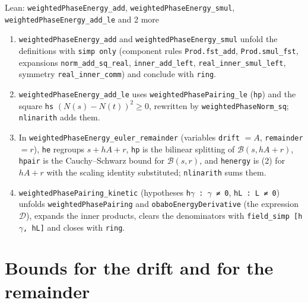 \documentclass[11pt,a4paper]{article}
\begin{document}
\begin{leanbox}{Lean: \texttt{weightedPhaseEnergy\_\allowbreak{}add}, \texttt{weightedPhaseEnergy\_\allowbreak{}smul}, \texttt{weightedPhaseEnergy\_\allowbreak{}add\_\allowbreak{}le} and 2 more}
\begin{enumerate}
\item \texttt{weighted\allowbreak{}Phase\allowbreak{}Energy\_\allowbreak{}add} and \texttt{weighted\allowbreak{}Phase\allowbreak{}Energy\_\allowbreak{}smul} unfold the definitions with \texttt{simp only} (component rules \texttt{Prod.\allowbreak{}fst\_\allowbreak{}add}, \texttt{Prod.\allowbreak{}smul\_\allowbreak{}fst}, expansions \texttt{norm\_\allowbreak{}add\_\allowbreak{}sq\_\allowbreak{}real}, \texttt{inner\_\allowbreak{}add\_\allowbreak{}left}, \texttt{real\_\allowbreak{}inner\_\allowbreak{}smul\_\allowbreak{}left}, symmetry \texttt{real\_\allowbreak{}inner\_\allowbreak{}comm}) and conclude with \texttt{ring}.

\item \texttt{weighted\allowbreak{}Phase\allowbreak{}Energy\_\allowbreak{}add\_\allowbreak{}le} uses \texttt{weighted\allowbreak{}Phase\allowbreak{}Pairing\_\allowbreak{}le} (\texttt{hp}) and the square \texttt{hs} \((N(s)-N(t))^2\ge0\), rewritten by \texttt{weighted\allowbreak{}Phase\allowbreak{}Norm\_\allowbreak{}sq}; \texttt{nlinarith} adds them.

\item In \texttt{weighted\allowbreak{}Phase\allowbreak{}Energy\_\allowbreak{}euler\_\allowbreak{}remainder} (variables \texttt{drift} \(=A\), \texttt{remainder} \(=r\)), \texttt{he} regroups \(s+hA+r\), \texttt{hp} is the bilinear splitting of \(\mathcal B(s,hA+r)\), \texttt{hpair} is the Cauchy–Schwarz bound for \(\mathcal B(s,r)\), and \texttt{henergy} is (2) for \(hA+r\) with the scaling identity substituted; \texttt{nlinarith} sums them.

\item \texttt{weighted\allowbreak{}Phase\allowbreak{}Pairing\_\allowbreak{}kinetic} (hypotheses \texttt{h\ensuremath{\gamma} : \ensuremath{\gamma} ≠ 0}, \texttt{h\allowbreak{}L : L ≠ 0}) unfolds \texttt{weighted\allowbreak{}Phase\allowbreak{}Pairing} and \texttt{obabo\allowbreak{}Energy\allowbreak{}Derivative} (the expression \(\mathcal D\)), expands the inner products, clears the denominators with \texttt{field\_\allowbreak{}simp [h\ensuremath{\gamma}, h\allowbreak{}L]} and closes with \texttt{ring}.

\end{enumerate}
\end{leanbox}

\section{\texorpdfstring{Bounds for the drift and for the remainder}{Bounds for the drift and for the remainder}}
\end{document}
